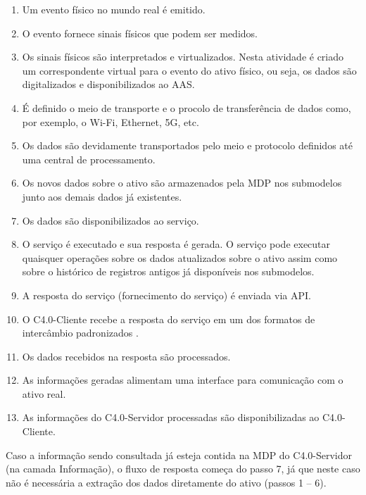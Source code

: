 \begin{enumerate}

	\item Um evento físico no mundo real é emitido.

	\item O evento fornece sinais físicos que podem ser medidos.

	\item Os sinais físicos são interpretados e virtualizados. Nesta atividade é criado um correspondente virtual para o evento do ativo físico, ou seja, os dados são digitalizados e disponibilizados ao AAS.

	\item É definido o meio de transporte e o procolo de transferência de dados como, por exemplo, o Wi-Fi, Ethernet, 5G, etc.

	\item Os dados são devidamente transportados pelo meio e protocolo definidos até uma central de processamento.

	\item Os novos dados sobre o ativo são armazenados pela MDP nos submodelos junto aos demais dados já existentes.

	\item Os dados são disponibilizados ao serviço.

	\item O serviço é executado e sua resposta é gerada. O serviço pode executar quaisquer operações sobre os dados atualizados sobre o ativo assim como sobre o histórico de registros antigos já disponíveis nos submodelos.

	\item A resposta do serviço (fornecimento do serviço) é enviada via API.

	\item O C4.0-Cliente recebe a resposta do serviço em um dos formatos de intercâmbio padronizados \cite{bader2019aas}.

	\item Os dados recebidos na resposta são processados.

	\item As informações geradas alimentam uma interface para comunicação com o ativo real.

	\item As informações do C4.0-Servidor processadas são disponibilizadas ao C4.0-Cliente.
\end{enumerate}

Caso a informação sendo consultada já esteja contida na MDP do C4.0-Servidor (na camada Informação), o fluxo de resposta começa do passo 7, já que neste caso não é necessária a extração dos dados diretamente do ativo (passos 1 -- 6).

